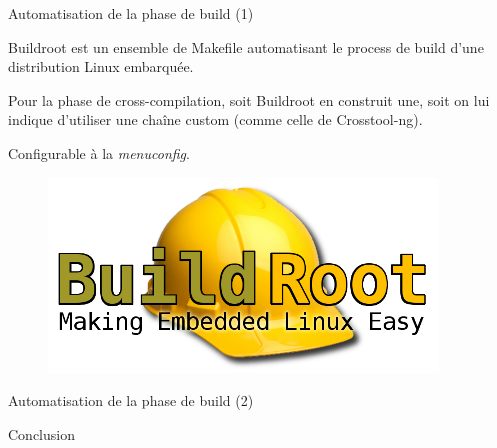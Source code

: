 \documentclass[12pt, t]{beamer}
\begin{document}
\begin{frame}{Automatisation de la phase de build (1)}

    \vspace{15pt}
    Buildroot est un ensemble de Makefile automatisant le process de build
    d'une distribution Linux embarquée.

    {
        \vspace{15pt}
        Pour la phase de cross-compilation, soit Buildroot en construit une, soit
        on lui indique d'utiliser une chaîne custom (comme celle de Crosstool-ng).
    }

    {
        \vspace{15pt}
        Configurable à la {\textit{menuconfig}}.
    }

    {
        \vspace{10pt}
        \begin{figure}
            \centering
            \includegraphics[scale=0.35]{logo-buildroot.png}
        \end{figure}
    }
\end{frame}

\begin{frame}{Automatisation de la phase de build (2)}
\end{frame}

\begin{frame}{Conclusion}

    \centering
    \vspace{20pt}
    \LARGE{
    }

\end{frame}
\end{document}
